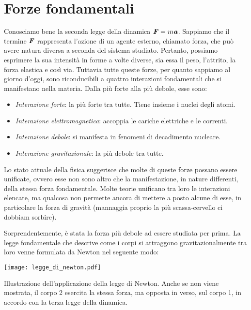 \marginpar{\minitoc}

\section{Forze fondamentali}
Conosciamo bene la seconda legge della dinamica $\textbf{\textit{F}} = m\textbf{\textit{a}}$.
Sappiamo che il termine $\textbf{\textit{F}}$ rappresenta l'azione di un agente esterno,
chiamato forza, che può avere natura diversa a seconda del sistema studiato.
Pertanto, possiamo esprimere
la sua intensità in forme a volte diverse, sia essa il peso, l'attrito, la
forza elastica e così via. Tuttavia tutte queste forze, per quanto sappiamo al
giorno d'oggi, sono riconducibili a quattro interazioni fondamentali che si
manifestano nella materia. Dalla più forte alla più debole, esse
sono:
\begin{itemize}
    \item \textit{Interazione forte}: la più forte tra tutte. Tiene insieme i nuclei
    degli atomi.

    \item \textit{Interazione elettromagnetica}: accoppia le cariche elettriche e
    le correnti.

    \item \textit{Interazione debole}: si manifesta in fenomeni di decadimento nucleare.
    
    \item \textit{Interazione gravitazionale}: la più debole tra tutte.
\end{itemize}
Lo stato attuale della fisica suggerisce che molte di queste forze possano essere
unificate, ovvero esse non sono altro che la manifestazione, in nature differenti,
della stessa forza fondamentale. Molte teorie unificano tra loro le interazioni
elencate, ma qualcosa non permette ancora di mettere a posto alcune di esse,
in particolare la forza di gravità (mannaggia proprio la più scassa-cervello ci
dobbiam sorbire).

Sorprendentemente, è stata la forza più debole ad essere studiata per prima.
La legge fondamentale che descrive come i corpi si attraggono gravitazionalmente tra
loro venne formulata da Newton nel seguente modo:

\begin{marginfigure}
    \centering
    \texttt{[image: legge\_di\_newton.pdf]}
    \caption{Illustrazione dell'applicazione della legge di Newton.
    Anche se non viene mostrata, il corpo 2 esercita la stessa
    forza, ma opposta in verso, sul corpo 1, in accordo con la
    terza legge della dinamica.}
    \label{gravitescionalfors}
\end{marginfigure}

